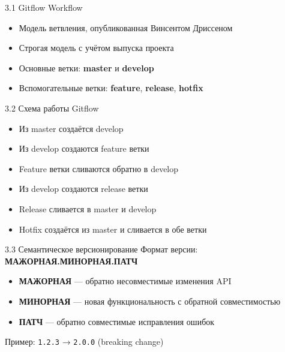 \documentclass[
  ignorenonframetext,
  aspectratio=169,
  russian,
]{beamer}
\providecommand{\tightlist}{%
  \setlength{\itemsep}{0pt}\setlength{\parskip}{0pt}}
\begin{document}
\begin{frame}{3.1 Gitflow Workflow}
\label{gitflow-workflow}
\begin{itemize}[<+->]
\tightlist
\item
  Модель ветвления, опубликованная Винсентом Дриссеном
\item
  Строгая модель с учётом выпуска проекта
\item
  Основные ветки: \textbf{master} и \textbf{develop}
\item
  Вспомогательные ветки: \textbf{feature}, \textbf{release},
  \textbf{hotfix}
\end{itemize}
\end{frame}

\begin{frame}{3.2 Схема работы Gitflow}
\label{ux441ux445ux435ux43cux430-ux440ux430ux431ux43eux442ux44b-gitflow}
\begin{itemize}[<+->]
\tightlist
\item
  Из master создаётся develop
\item
  Из develop создаются feature ветки
\item
  Feature ветки сливаются обратно в develop
\item
  Из develop создаются release ветки
\item
  Release сливается в master и develop
\item
  Hotfix создаётся из master и сливается в обе ветки
\end{itemize}
\end{frame}

\begin{frame}[fragile]{3.3 Семантическое версионирование}
\label{ux441ux435ux43cux430ux43dux442ux438ux447ux435ux441ux43aux43eux435-ux432ux435ux440ux441ux438ux43eux43dux438ux440ux43eux432ux430ux43dux438ux435}
Формат версии: \textbf{МАЖОРНАЯ.МИНОРНАЯ.ПАТЧ}

\begin{itemize}[<+->]
\tightlist
\item
  \textbf{МАЖОРНАЯ} --- обратно несовместимые изменения API
\item
  \textbf{МИНОРНАЯ} --- новая функциональность с обратной совместимостью
\item
  \textbf{ПАТЧ} --- обратно совместимые исправления ошибок
\end{itemize}

Пример: \texttt{1.2.3} → \texttt{2.0.0} (breaking change)
\end{frame}
\end{document}
